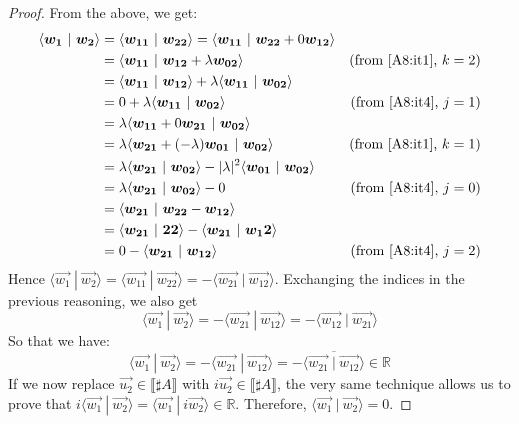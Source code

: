 \documentclass[runningheads,orivec,envcountsame,envcountsect]{llncs}
\def\R{\mathbb{R}}            %
\def\scal#1#2{\langle{#1}~|~{#2}\rangle}
\def\sem#1{\llbracket#1\rrbracket}
\begin{document}
\begin{proof}
    From the above, we get:
    \begin{align*}
        \scal{\vec{w_1}}{\vec{w_2}} &= \scal{\vec{w_{11}}}{\vec{w_{22}}} = \scal{\vec{w_{11}}}{\vec{w_{22}}+0\vec{w_{12}}} & \\
        &=\scal{\vec{w_{11}}}{\vec{w_{12}}+ \lambda\vec{w_{02}}} & (\text{from \Cref{A8:it1}, } k=2)\\
        &=\scal{\vec{w_{11}}}{\vec{w_{12}}} + \lambda \scal{\vec{w_{11}}}{\vec{w_{02}}} &\\
        &= 0 + \lambda \scal{\vec{w_{11}}}{\vec{w_{02}}} & (\text{from \Cref{A8:it4}, } j=1)\\
        &= \lambda \scal{\vec{w_{11}} + 0\vec{w_{21}}}{\vec{w_{02}}} & \\
        &= \lambda \scal{\vec{w_{21}} + (-\lambda)\vec{w_{01}}}{\vec{w_{02}}} & (\text{from \Cref{A8:it1}, } k=1)\\
        &= \lambda \scal{\vec{w_{21}}}{\vec{w_{02}}} - |\lambda|^2 \scal{\vec{w_{01}}}{\vec{w_{02}}} & \\
        &= \lambda \scal{\vec{w_{21}}}{\vec{w_{02}}} - 0 & (\text{from \Cref{A8:it4}, } j=0)\\
        &=\scal{\vec{w_{21}}}{\vec{w_{22}}- \vec{w_{12}}} & \\
        &=\scal{\vec{w_{21}}}{\vec{22}} - \scal{\vec{w_{21}}}{\vec{w_12}} & \\
        &= 0 - \scal{\vec{w_{21}}}{\vec{w_{12}}} & (\text{from \Cref{A8:it4}, } j=2)\\
    \end{align*}
    Hence $\scal{\vec{w_1}}{\vec{w_2}} = \scal{\vec{w_{11}}}{\vec{w_{22}}} = - \scal{\vec{w_{21}}}{\vec{w_{12}}}$. Exchanging the indices in the previous reasoning, we also get 
    \[
    \scal{\vec{w_1}}{\vec{w_2}}=-\scal{\vec{w_{21}}}{\vec{w_{12}}}=-\scal{\vec{w_{12}}}{\vec{w_{21}}}
    \]
    So that we have:
    \[
        \scal{\vec{w_1}}{\vec{w_2}}=-\scal{\vec{w_{21}}}{\vec{w_{12}}}=-\overline{\scal{\vec{w_{21}}}{\vec{w_{12}}}}\in\R
    \]
    If we now replace $\vec{u_2}\in\sem{\sharp A}$ with $i\vec{u_2}\in\sem{\sharp A}$, the very same technique allows us to prove that $i\scal{\vec{w_1}}{\vec{w_2}}=\scal{\vec{w_1}}{i \vec{w_2}}\in\R$. Therefore, $\scal{\vec{w_1}}{\vec{w_2}}=0$.
\end{proof}
\end{document}
